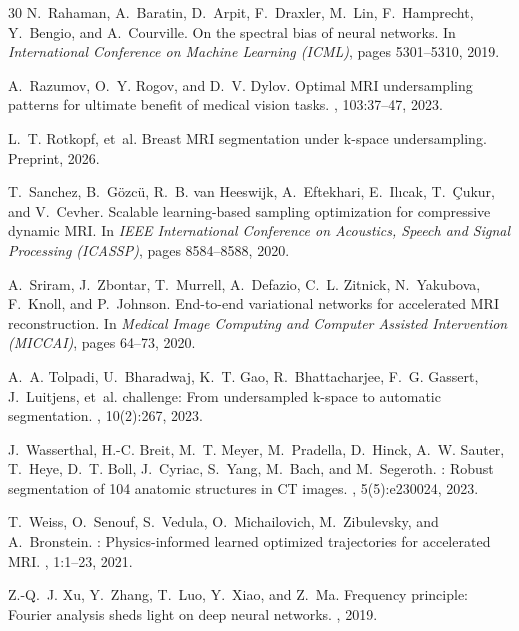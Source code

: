 \documentclass[10pt,twocolumn,letterpaper]{article}
\begin{document}
\begin{thebibliography}{30}
N.~Rahaman, A.~Baratin, D.~Arpit, F.~Draxler, M.~Lin, F.~Hamprecht, Y.~Bengio, and A.~Courville.
\newblock On the spectral bias of neural networks.
\newblock In {\em International Conference on Machine Learning (ICML)}, pages 5301--5310, 2019.

A.~Razumov, O.~Y. Rogov, and D.~V. Dylov.
\newblock Optimal {MRI} undersampling patterns for ultimate benefit of medical vision tasks.
, 103:37--47, 2023.

L.~T. Rotkopf, et~al.
\newblock Breast {MRI} segmentation under k-space undersampling.
\newblock Preprint, 2026.

T.~Sanchez, B.~G\"{o}zc\"{u}, R.~B. van Heeswijk, A.~Eftekhari, E.~Il{\i}cak, T.~\c{C}ukur, and V.~Cevher.
\newblock Scalable learning-based sampling optimization for compressive dynamic {MRI}.
\newblock In {\em IEEE International Conference on Acoustics, Speech and Signal Processing (ICASSP)}, pages 8584--8588, 2020.

A.~Sriram, J.~Zbontar, T.~Murrell, A.~Defazio, C.~L. Zitnick, N.~Yakubova, F.~Knoll, and P.~Johnson.
\newblock End-to-end variational networks for accelerated {MRI} reconstruction.
\newblock In {\em Medical Image Computing and Computer Assisted Intervention (MICCAI)}, pages 64--73, 2020.

A.~A. Tolpadi, U.~Bharadwaj, K.~T. Gao, R.~Bhattacharjee, F.~G. Gassert, J.~Luitjens, et~al.
 challenge: From undersampled k-space to automatic segmentation.
, 10(2):267, 2023.

J.~Wasserthal, H.-C. Breit, M.~T. Meyer, M.~Pradella, D.~Hinck, A.~W. Sauter, T.~Heye, D.~T. Boll, J.~Cyriac, S.~Yang, M.~Bach, and M.~Segeroth.
: Robust segmentation of 104 anatomic structures in {CT} images.
, 5(5):e230024, 2023.

T.~Weiss, O.~Senouf, S.~Vedula, O.~Michailovich, M.~Zibulevsky, and A.~Bronstein.
: Physics-informed learned optimized trajectories for accelerated {MRI}.
, 1:1--23, 2021.

Z.-Q.~J. Xu, Y.~Zhang, T.~Luo, Y.~Xiao, and Z.~Ma.
\newblock Frequency principle: {Fourier} analysis sheds light on deep neural networks.
, 2019.


\end{thebibliography}
\end{document}
